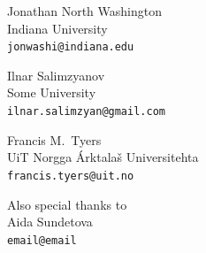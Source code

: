 \documentclass[a0paper,fontscale=0.3]{baposter}  %
\begin{document}
\begin{poster}
{			\vspace{-0.5em}
			\begin{center}
			{\begin{minipage}[t]{11.75em}
				\begin{spacing}{0.4}
					{Jonathan North Washington}\\
					{\footnotesize Indiana University\\\texttt{jonwashi@indiana.edu}}
				\end{spacing}
			\end{minipage}
			\begin{minipage}[t]{9.5em}
				\begin{spacing}{0.4}
					{Ilnar Salimzyanov}\\
					{\footnotesize Some University\\\texttt{ilnar.salimzyan@gmail.com}}
				\end{spacing}
			\end{minipage}
			\begin{minipage}[t]{8.2em}
				\begin{spacing}{0.4}
					{Francis M.\ Tyers}\\
					{\footnotesize UiT Norgga Árktalaš Universitehta \\\texttt{francis.tyers@uit.no}}
				\end{spacing}
			\end{minipage}}
			\begin{minipage}[t]{7em}
				\begin{spacing}{0.4}
					{\footnotesize Also special thanks to}\\
					{\small Aida Sundetova}\\
					{\footnotesize \texttt{email@email}}
				\end{spacing}
			\end{minipage}
			\end{center}


}
\end{poster}
\end{document}
